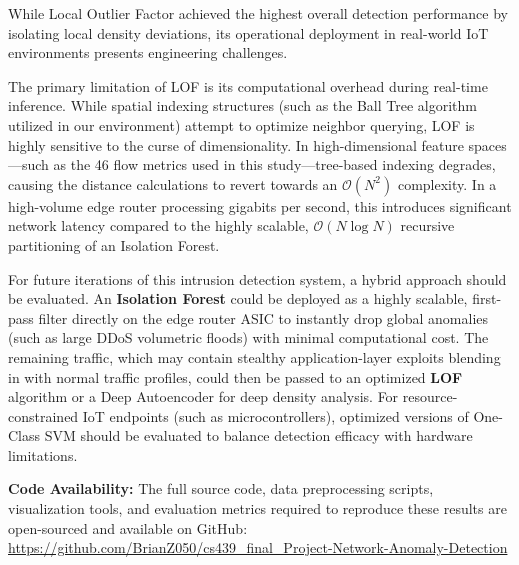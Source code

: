 \documentclass{article}
\begin{document}
While Local Outlier Factor achieved the highest overall detection performance by isolating local density deviations, its operational deployment in real-world IoT environments presents engineering challenges. 

The primary limitation of LOF is its computational overhead during real-time inference. While spatial indexing structures (such as the Ball Tree algorithm utilized in our environment) attempt to optimize neighbor querying, LOF is highly sensitive to the curse of dimensionality. In high-dimensional feature spaces---such as the 46 flow metrics used in this study---tree-based indexing degrades, causing the distance calculations to revert towards an $\mathcal{O}(N^2)$ complexity. In a high-volume edge router processing gigabits per second, this introduces significant network latency compared to the highly scalable, $\mathcal{O}(N \log N)$ recursive partitioning of an Isolation Forest.

For future iterations of this intrusion detection system, a hybrid approach should be evaluated. An \textbf{Isolation Forest} could be deployed as a highly scalable, first-pass filter directly on the edge router ASIC to instantly drop global anomalies (such as large DDoS volumetric floods) with minimal computational cost. The remaining traffic, which may contain stealthy application-layer exploits blending in with normal traffic profiles, could then be passed to an optimized \textbf{LOF} algorithm or a Deep Autoencoder for deep density analysis. For resource-constrained IoT endpoints (such as microcontrollers), optimized versions of One-Class SVM should be evaluated to balance detection efficacy with hardware limitations.

\medskip

\textbf{Code Availability:}
The full source code, data preprocessing scripts, visualization tools, and evaluation metrics required to reproduce these results are open-sourced and available on GitHub: \url{https://github.com/BrianZ050/cs439_final_Project-Network-Anomaly-Detection}
\end{document}
